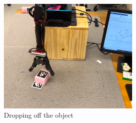 \begin{figure}[htb]
\centering
\label{fig:DropPose}
\includegraphics[width=7cm]{Figures/Drop-Off.jpeg}
\caption{Dropping off the object}
\centering
\end{figure}

